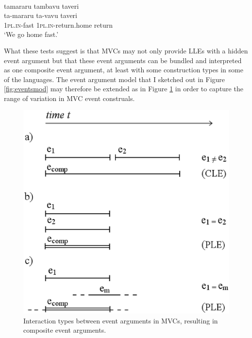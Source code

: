 \ea \label{Wooi41} 
\\
\glll tamararu tambavu taveri \\
ta-mararu ta-vavu taveri \\
1\textsc{pl}.\textsc{in}-fast 1\textsc{pl}.\textsc{in}-return.home return\\
\glft `We go home fast.' \\ 
\z

What these tests suggest is that MVCs may not only provide LLEs with a hidden event argument but that these event arguments can be bundled and interpreted as one composite event argument, at least with some construction types in some of the languages. The event argument model that I sketched out in Figure \ref{fig:eventsmod} may therefore be extended as in Figure \ref{fig:eventsmod2} in order to capture the range of variation in MVC event construals.

\begin{figure}
\includegraphics[width=1.0\textwidth]{figures/eventschemamod.eps} 
\caption{Interaction types between event arguments in MVCs, resulting in composite event arguments.}\label{fig:eventsmod2}
\end{figure}


